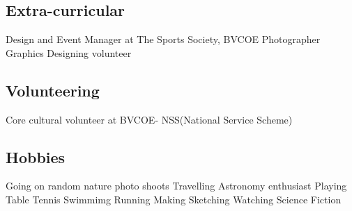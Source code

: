 \documentclass[]{deedy-resume-openfont}
\begin{document}
\begin{minipage}[t]{0.33\textwidth}
\subsection{Extra-curricular}
Design and Event Manager at The Sports Society, BVCOE \textbullet{}
Photographer\textbullet{}
Graphics Designing volunteer\\
\vspace{0.1in}
\vspace{0.05in}
\subsection{Volunteering}
Core cultural volunteer at BVCOE- NSS(National Service Scheme)\\ 
\subsection{Hobbies}
Going on random nature photo shoots \textbullet{} Travelling \textbullet{} Astronomy enthusiast \textbullet{} Playing Table Tennis \textbullet{}Swimmimg \textbullet{}Running \textbullet{} Making  \textbullet{}Sketching \textbullet{} Watching Science Fiction


\end{minipage}
\hfill\vline\hfill
\end{document}
